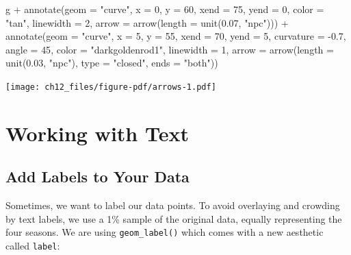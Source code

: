 \documentclass[
  letterpaper,
  DIV=11,
  numbers=noendperiod]{scrreprt}
\newenvironment{Shaded}{\begin{snugshade}}{\end{snugshade}}
\newcommand{\AttributeTok}[1]{\textcolor[rgb]{0.40,0.45,0.13}{#1}}
\newcommand{\DecValTok}[1]{\textcolor[rgb]{0.68,0.00,0.00}{#1}}
\newcommand{\FloatTok}[1]{\textcolor[rgb]{0.68,0.00,0.00}{#1}}
\newcommand{\FunctionTok}[1]{\textcolor[rgb]{0.28,0.35,0.67}{#1}}
\newcommand{\NormalTok}[1]{\textcolor[rgb]{0.00,0.23,0.31}{#1}}
\newcommand{\SpecialCharTok}[1]{\textcolor[rgb]{0.37,0.37,0.37}{#1}}
\newcommand{\StringTok}[1]{\textcolor[rgb]{0.13,0.47,0.30}{#1}}
\begin{document}
\begin{Shaded}
\begin{Highlighting}[]
\NormalTok{g }\SpecialCharTok{+}
  \FunctionTok{annotate}\NormalTok{(}\AttributeTok{geom =} \StringTok{"curve"}\NormalTok{, }\AttributeTok{x =} \DecValTok{0}\NormalTok{, }\AttributeTok{y =} \DecValTok{60}\NormalTok{, }\AttributeTok{xend =} \DecValTok{75}\NormalTok{, }\AttributeTok{yend =} \DecValTok{0}\NormalTok{,}
             \AttributeTok{color =} \StringTok{"tan"}\NormalTok{, }\AttributeTok{linewidth =} \DecValTok{2}\NormalTok{, }
             \AttributeTok{arrow =} \FunctionTok{arrow}\NormalTok{(}\AttributeTok{length =} \FunctionTok{unit}\NormalTok{(}\FloatTok{0.07}\NormalTok{, }\StringTok{"npc"}\NormalTok{))) }\SpecialCharTok{+}
  \FunctionTok{annotate}\NormalTok{(}\AttributeTok{geom =} \StringTok{"curve"}\NormalTok{, }\AttributeTok{x =} \DecValTok{5}\NormalTok{, }\AttributeTok{y =} \DecValTok{55}\NormalTok{, }\AttributeTok{xend =} \DecValTok{70}\NormalTok{, }\AttributeTok{yend =} \DecValTok{5}\NormalTok{,}
             \AttributeTok{curvature =} \SpecialCharTok{{-}}\FloatTok{0.7}\NormalTok{, }\AttributeTok{angle =} \DecValTok{45}\NormalTok{,}
             \AttributeTok{color =} \StringTok{"darkgoldenrod1"}\NormalTok{, }\AttributeTok{linewidth =} \DecValTok{1}\NormalTok{,}
             \AttributeTok{arrow =} \FunctionTok{arrow}\NormalTok{(}\AttributeTok{length =} \FunctionTok{unit}\NormalTok{(}\FloatTok{0.03}\NormalTok{, }\StringTok{"npc"}\NormalTok{),}
                           \AttributeTok{type =} \StringTok{"closed"}\NormalTok{,}
                           \AttributeTok{ends =} \StringTok{"both"}\NormalTok{))}
\end{Highlighting}
\end{Shaded}

\texttt{[image: ch12\_files/figure-pdf/arrows-1.pdf]}


\chapter{Working with Text}\label{text}

\section{Add Labels to Your Data}\label{add-labels-to-your-data}

Sometimes, we want to label our data points. To avoid overlaying and
crowding by text labels, we use a 1\% sample of the original data,
equally representing the four seasons. We are using
\texttt{geom\_label()} which comes with a new aesthetic called
\texttt{label}:
\end{document}
